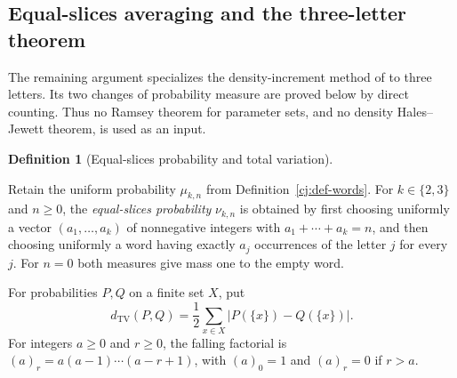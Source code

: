 \documentclass[11pt]{amsart}
\theoremstyle{definition}
\newtheorem{definition}[theorem]{Definition}
\theoremstyle{remark}
\numberwithin{equation}{section}
\providecommand{\lean}[1]{}
\begin{document}
\subsection{Equal-slices averaging and the three-letter theorem}

The remaining argument specializes the density-increment method of
\cite{Polymath} to three letters.  Its two changes of probability measure
are proved below by direct counting.  Thus no Ramsey theorem for
parameter sets, and no density Hales--Jewett theorem, is used as an input.

\begin{definition}[Equal-slices probability and total variation]\label{cj:equal-slices}
\lean{Auto.equalSlices,Auto.dTV}
Retain the uniform probability $\mu_{k,n}$ from
Definition~\ref{cj:def-words}.  For $k\in\{2,3\}$ and $n\ge0$,
the \emph{equal-slices probability} $\nu_{k,n}$ is obtained
by first choosing uniformly a vector $(a_1,\ldots,a_k)$ of nonnegative
integers with $a_1+\cdots+a_k=n$, and then choosing uniformly a word
having exactly $a_j$ occurrences of the letter $j$ for every $j$.
For $n=0$ both measures give mass one to the empty word.

For probabilities $P,Q$ on a finite set $X$, put
\[
 d_{\mathrm{TV}}(P,Q)=\frac12\sum_{x\in X}|P(\{x\})-Q(\{x\})|.
\]
For integers $a\ge0$ and $r\ge0$, the falling factorial is
$(a)_r=a(a-1)\cdots(a-r+1)$, with $(a)_0=1$ and $(a)_r=0$ if
$r>a$.
\end{definition}
\end{document}
